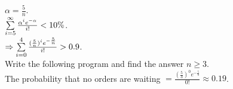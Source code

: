 \begin{pr}
$\alpha=\frac5n$.\\
$\sum\limits_{i=5}^\infty\frac{\alpha^ie^{-\alpha}}{i!}<10\%$.\\
$\Rightarrow\sum\limits_{i=0}^4\frac{(\frac5n)^ie^{-\frac5n}}{i!}>0.9$.\\
Write the following program and find the answer $n\geq3$.\\
The probability that no orders are waiting $=\frac{(\frac53)^0e^{-\frac53}}{0!}\approx0.19$.\\

\end{pr}
